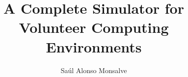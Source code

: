 % 
% 
%
%
%
%
%
%
%
% 
% 


\title{A Complete Simulator for Volunteer Computing Environments}

\author{Sa\'ul Alonso Monsalve}


